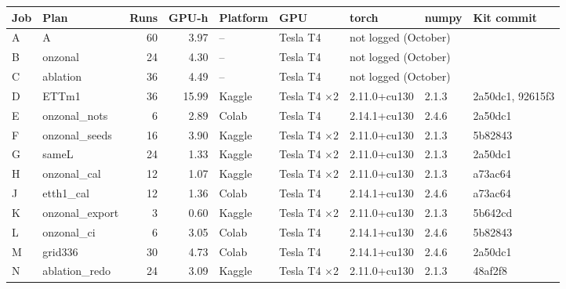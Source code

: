 \begin{tabular}{@{}llrrlllll@{}}
\toprule
Job & Plan & Runs & GPU-h & Platform & GPU & torch & numpy & Kit commit \\
\midrule
A & A & 60 & 3.97 & -- & Tesla T4 & \multicolumn{3}{l}{not logged (October)} \\
B & onzonal & 24 & 4.30 & -- & Tesla T4 & \multicolumn{3}{l}{not logged (October)} \\
C & ablation & 36 & 4.49 & -- & Tesla T4 & \multicolumn{3}{l}{not logged (October)} \\
D & ETTm1 & 36 & 15.99 & Kaggle & Tesla T4 $\times$2 & 2.11.0+cu130 & 2.1.3 & 2a50dc1, 92615f3 \\
E & onzonal\_nots & 6 & 2.89 & Colab & Tesla T4 & 2.14.1+cu130 & 2.4.6 & 2a50dc1 \\
F & onzonal\_seeds & 16 & 3.90 & Kaggle & Tesla T4 $\times$2 & 2.11.0+cu130 & 2.1.3 & 5b82843 \\
G & sameL & 24 & 1.33 & Kaggle & Tesla T4 $\times$2 & 2.11.0+cu130 & 2.1.3 & 2a50dc1 \\
H & onzonal\_cal & 12 & 1.07 & Kaggle & Tesla T4 $\times$2 & 2.11.0+cu130 & 2.1.3 & a73ac64 \\
J & etth1\_cal & 12 & 1.36 & Colab & Tesla T4 & 2.14.1+cu130 & 2.4.6 & a73ac64 \\
K & onzonal\_export & 3 & 0.60 & Kaggle & Tesla T4 $\times$2 & 2.11.0+cu130 & 2.1.3 & 5b642cd \\
L & onzonal\_ci & 6 & 3.05 & Colab & Tesla T4 & 2.14.1+cu130 & 2.4.6 & 5b82843 \\
M & grid336 & 30 & 4.73 & Colab & Tesla T4 & 2.14.1+cu130 & 2.4.6 & 2a50dc1 \\
N & ablation\_redo & 24 & 3.09 & Kaggle & Tesla T4 $\times$2 & 2.11.0+cu130 & 2.1.3 & 48af2f8 \\

\end{tabular}
